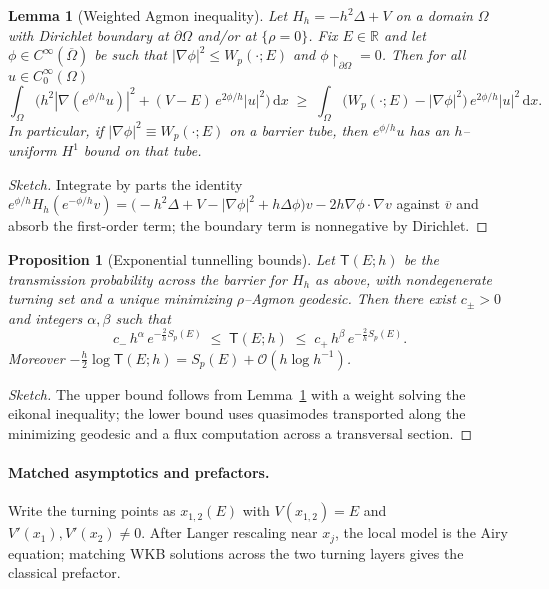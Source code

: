 \documentclass[11pt]{article}
\newtheorem{lemma}[theorem]{Lemma}
\newtheorem{proposition}[theorem]{Proposition}
\theoremstyle{definition}
\begin{document}
    \begin{lemma}[Weighted Agmon inequality]\label{lem:A-agmon}
    	Let $H_h=-h^2\Delta+V$ on a domain $\Omega$ with Dirichlet boundary at $\partial\Omega$ and/or at $\{\rho=0\}$.
    	Fix $E\in\mathbb{R}$ and let $\phi\in C^\infty(\overline{\Omega})$ be such that $|\nabla\phi|^2\le W_p(\cdot;E)$ and $\phi\!\restriction_{\partial\Omega}=0$.
    	Then for all $u\in C_0^\infty(\Omega)$
    	\[
    	\int_\Omega \!\Big(h^2 |\nabla(e^{\phi/h}u)|^2 + (V-E)\,e^{2\phi/h}|u|^2\Big)\,\mathrm{d}x 
    	\;\ge\; \int_\Omega \!\big(W_p(\cdot;E)-|\nabla\phi|^2\big)\,e^{2\phi/h}|u|^2\,\mathrm{d}x.
    	\]
    	In particular, if $|\nabla\phi|^2\equiv W_p(\cdot;E)$ on a barrier tube, then $e^{\phi/h}u$ has an $h$–uniform $H^1$ bound on that tube.
    \end{lemma}
    
    \begin{proof}[Sketch]
    	Integrate by parts the identity
    	$e^{\phi/h} H_h (e^{-\phi/h}v) = \big(-h^2\Delta + V -|\nabla\phi|^2 + h \Delta\phi\big)v - 2h \nabla\phi\cdot\nabla v$
    	against $\overline v$ and absorb the first-order term; the boundary term is nonnegative by Dirichlet. 
    \end{proof}
    
    \begin{proposition}[Exponential tunnelling bounds]\label{prop:A-sandwich}
    	Let $\mathsf{T}(E;h)$ be the transmission probability across the barrier for $H_h$ as above, with nondegenerate turning set and a unique minimizing $\rho$–Agmon geodesic. 
    	Then there exist $c_\pm>0$ and integers $\alpha,\beta$ such that
    	\[
    	c_-\,h^{\alpha}\,e^{-\tfrac{2}{h}S_p(E)} \;\le\; \mathsf{T}(E;h) \;\le\; c_+\,h^{\beta}\,e^{-\tfrac{2}{h}S_p(E)}.
    	\]
    	Moreover $-\tfrac{h}{2}\log\mathsf{T}(E;h)=S_p(E)+\mathcal{O}(h\log h^{-1})$.
    \end{proposition}
    
    \begin{proof}[Sketch]
    	The upper bound follows from Lemma~\ref{lem:A-agmon} with a weight solving the eikonal inequality; the lower bound uses quasimodes transported along the minimizing geodesic and a flux computation across a transversal section. 
    \end{proof}
    
    \paragraph{Matched asymptotics and prefactors.}
    Write the turning points as $x_{1,2}(E)$ with $V(x_{1,2})=E$ and $V'(x_1),V'(x_2)\neq 0$. 
    After Langer rescaling near $x_j$, the local model is the Airy equation; matching WKB solutions across the two turning layers gives the classical prefactor.
    
\end{document}
